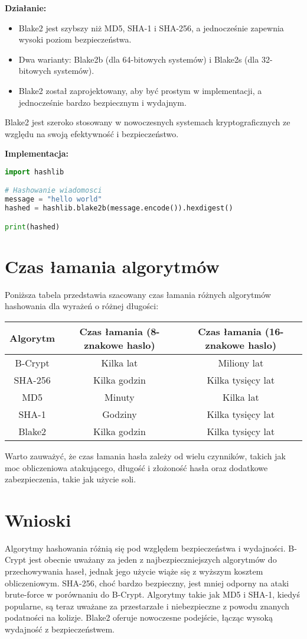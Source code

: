 \documentclass{article}
\begin{document}
\textbf{Działanie:}
\begin{itemize}
    \item Blake2 jest szybszy niż MD5, SHA-1 i SHA-256, a jednocześnie zapewnia wysoki poziom bezpieczeństwa.
    \item Dwa warianty: Blake2b (dla 64-bitowych systemów) i Blake2s (dla 32-bitowych systemów).
    \item Blake2 został zaprojektowany, aby być prostym w implementacji, a jednocześnie bardzo bezpiecznym i wydajnym.
\end{itemize}

Blake2 jest szeroko stosowany w nowoczesnych systemach kryptograficznych ze względu na swoją efektywność i bezpieczeństwo.

\textbf{Implementacja:}
\begin{lstlisting}[language=Python]
import hashlib

# Hashowanie wiadomosci
message = "hello world"
hashed = hashlib.blake2b(message.encode()).hexdigest()

print(hashed)
\end{lstlisting}

\section{Czas łamania algorytmów}

Poniższa tabela przedstawia szacowany czas łamania różnych algorytmów hashowania dla wyrażeń o różnej długości:

\begin{tabular}{|c|c|c|}
\hline
Algorytm & Czas łamania (8-znakowe haslo) & Czas łamania (16-znakowe haslo) \\
\hline
B-Crypt & Kilka lat & Miliony lat \\
SHA-256 & Kilka godzin & Kilka tysięcy lat \\
MD5 & Minuty & Kilka lat \\
SHA-1 & Godziny & Kilka tysięcy lat \\
Blake2 & Kilka godzin & Kilka tysięcy lat \\
\hline
\end{tabular}

Warto zauważyć, że czas łamania hasła zależy od wielu czynników, takich jak moc obliczeniowa atakującego, długość i złożoność hasła oraz dodatkowe zabezpieczenia, takie jak użycie soli.

\section{Wnioski}
Algorytmy hashowania różnią się pod względem bezpieczeństwa i wydajności. B-Crypt jest obecnie uważany za jeden z najbezpieczniejszych algorytmów do przechowywania haseł, jednak jego użycie wiąże się z wyższym kosztem obliczeniowym. SHA-256, choć bardzo bezpieczny, jest mniej odporny na ataki brute-force w porównaniu do B-Crypt. Algorytmy takie jak MD5 i SHA-1, kiedyś popularne, są teraz uważane za przestarzałe i niebezpieczne z powodu znanych podatności na kolizje. Blake2 oferuje nowoczesne podejście, łącząc wysoką wydajność z bezpieczeństwem.
\end{document}

